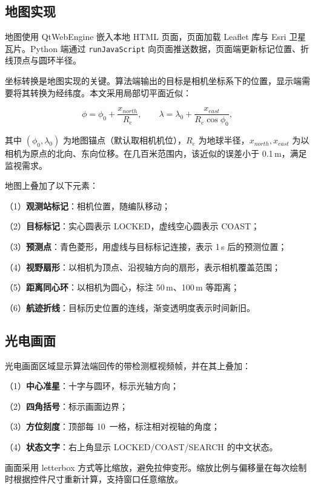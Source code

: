 \subsection{地图实现}

地图使用 QtWebEngine 嵌入本地 HTML 页面，页面加载 Leaflet 库与 Esri 卫星瓦片。Python 端通过 \texttt{runJavaScript} 向页面推送数据，页面端更新标记位置、折线顶点与圆环半径。

坐标转换是地图实现的关键。算法端输出的目标是相机坐标系下的位置，显示端需要将其转换为经纬度。本文采用局部切平面近似：

\begin{equation}
\phi = \phi_0 + \frac{x_{north}}{R_e},\qquad
\lambda = \lambda_0 + \frac{x_{east}}{R_e\cos\phi_0},
\label{eq:geo}
\end{equation}

其中 $(\phi_0,\lambda_0)$ 为地图锚点（默认取相机机位），$R_e$ 为地球半径，$x_{north},x_{east}$ 为以相机为原点的北向、东向位移。在几百米范围内，该近似的误差小于 0.1\,m，满足监视需求。

地图上叠加了以下元素：

（1）\textbf{观测站标记}：相机位置，随编队移动；

（2）\textbf{目标标记}：实心圆表示 LOCKED，虚线空心圆表示 COAST；

（3）\textbf{预测点}：青色菱形，用虚线与目标标记连接，表示 1\,s 后的预测位置；

（4）\textbf{视野扇形}：以相机为顶点、沿视轴方向的扇形，表示相机覆盖范围；

（5）\textbf{距离同心环}：以相机为圆心，标注 50\,m、100\,m 等距离；

（6）\textbf{航迹折线}：目标历史位置的连线，渐变透明度表示时间新旧。

\subsection{光电画面}

光电画面区域显示算法端回传的带检测框视频帧，并在其上叠加：

（1）\textbf{中心准星}：十字与圆环，标示光轴方向；

（2）\textbf{四角括号}：标示画面边界；

（3）\textbf{方位刻度}：顶部每 10\textdegree\ 一格，标注相对视轴的角度；

（4）\textbf{状态文字}：右上角显示 LOCKED/COAST/SEARCH 的中文状态。

画面采用 letterbox 方式等比缩放，避免拉伸变形。缩放比例与偏移量在每次绘制时根据控件尺寸重新计算，支持窗口任意缩放。

